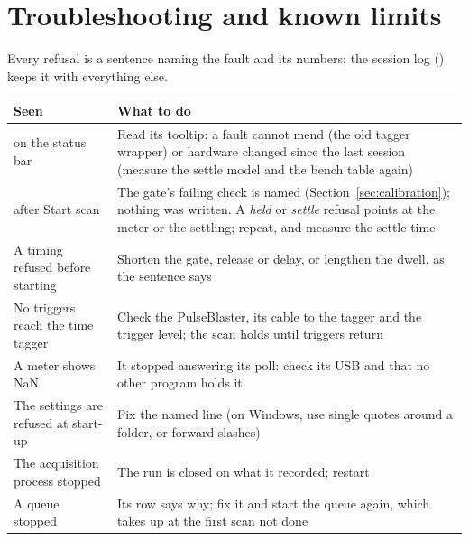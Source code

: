 \section{Troubleshooting and known limits}
\label{sec:troubleshooting}

Every refusal is a sentence naming the fault and its numbers; the session log
() keeps it with everything else.

\begin{center}
\small
\begin{tabularx}{\textwidth}{@{}>{\raggedright\arraybackslash}p{}L@{}}
\toprule
Seen & What to do \\
\midrule
{} on the status bar & Read its tooltip: a fault \oracle{} cannot mend (the
    old tagger wrapper) or hardware changed since the last session (measure the settle
    model and the bench table again) \\
 after Start scan & The gate's failing check is named
    (Section~\ref{sec:calibration}); nothing was written. A \emph{held} or \emph{settle}
    refusal points at the meter or the settling; repeat, and measure the settle time \\
A timing refused before starting & Shorten the gate, release or delay, or lengthen the
    dwell, as the sentence says \\
No triggers reach the time tagger & Check the PulseBlaster, its cable to the tagger and the
    trigger level; the scan holds until triggers return \\
A meter shows NaN & It stopped answering its poll: check its USB and that no other program
    holds it \\
The settings are refused at start-up & Fix the named line (on Windows, use single quotes
    around a folder, or forward slashes) \\
The acquisition process stopped & The run is closed on what it recorded; restart \oracle{} \\
A queue stopped & Its row says why; fix it and start the queue again, which takes up at the
    first scan not done \\
\bottomrule
\end{tabularx}
\end{center}


